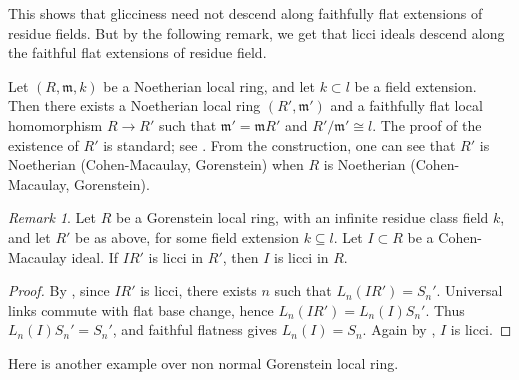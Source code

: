\documentclass[11pt,letterpaper]{amsart}
\newcommand{\seq}{\subseteq}
\theoremstyle{plain}
\theoremstyle{definition}
\theoremstyle{remark}
\newtheorem{remark}[thm]{Remark}
\begin{document}
This shows that glicciness need not descend along faithfully flat extensions of residue fields. But by the following remark, we get that licci ideals descend along the faithful flat extensions of residue field. 

Let $(R,\mathfrak m,k)$ be a Noetherian local ring, and let $k\subset l$ be a field extension. Then there exists a Noetherian local ring $(R',\mathfrak m')$ and a faithfully flat local homomorphism $R\to R'$ such that $\mathfrak m'=\mathfrak mR'$ and $R'/\mathfrak m'\cong l$. The proof of the existence of $R'$ is standard; see  \cite[\href{https://stacks.math.columbia.edu/tag/03C3}{Tag 03C3}]{stacks-project}. From the construction, one can see that $R'$ is Noetherian (Cohen-Macaulay, Gorenstein) when $R$ is Noetherian (Cohen-Macaulay, Gorenstein).

\begin{remark}
   Let $R$ be a Gorenstein local ring, with an infinite residue class field $k$, and let $R'$ be as above, for some field extension $k\seq l$. Let \(I\subset R\) be a Cohen-Macaulay ideal. If \(IR'\) is licci in \(R'\), then \(I\) is licci in \(R\). 
\end{remark}
 

\begin{proof}
By \cite[Proposition~2.3]{johnson2014ubiquity}, since \(IR'\) is licci, there exists \(n\) such that \(L_n(IR')=S_n'\).
Universal links commute with flat base change, hence \(L_n(IR')=L_n(I)S_n'\).
Thus \(L_n(I)S_n'=S_n'\), and faithful flatness gives \(L_n(I)=S_n\).
Again by \cite[Proposition~2.3]{johnson2014ubiquity}, \(I\) is licci.
\end{proof}

Here is another example over non normal Gorenstein local ring. 
\end{document}

